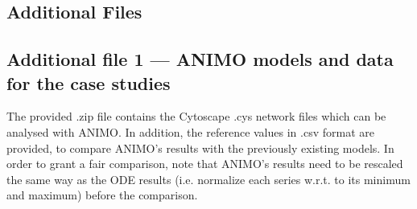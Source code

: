 \documentclass{bmcart}
\begin{document}
\begin{backmatter}






\clearpage

\section*{Additional Files}
  \subsection*{Additional file 1 --- ANIMO models and data for the case studies}
      The provided .zip file contains the Cytoscape .cys network files which can be analysed
      with ANIMO. In addition, the reference values in .csv format are provided, to compare
      ANIMO's results with the previously existing models. In order to grant a fair comparison,
      note that ANIMO's results need to be rescaled the same way as the ODE results
      (i.e. normalize each series w.r.t. to its minimum and maximum) before the comparison.


\end{backmatter}



\appendix
\clearpage
\setcounter{figure}{0}
\setcounter{table}{0}
\setcounter{page}{1}
\onecolumn


\end{document}
